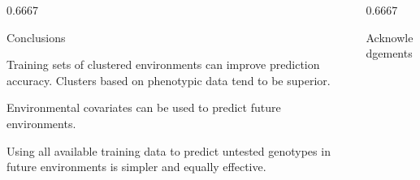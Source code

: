 \documentclass[final]{beamer}
\newlength{\onecolwid}
\newlength{\twocolwid}
\begin{document}
\begin{frame}[t]
\begin{columns}[t]
\begin{column}{\twocolwid}
\begin{columns}[t,totalwidth=\twocolwid]

\begin{column}{0.6667\onecolwid}


\begin{alertblock}{Conclusions}

\begin{footnotesize}

Training sets of clustered environments can improve prediction accuracy. Clusters based on phenotypic data tend to be superior.

\vspace{0.5cm}

Environmental covariates can be used to predict future environments.

\vspace{0.5cm}

Using all available training data to predict untested genotypes in future environments is simpler and equally effective.



\end{footnotesize}

\end{alertblock}


\end{column}




\begin{column}{0.6667\onecolwid} %



\begin{block}{\large{Acknowledgements}}


\end{block}
\end{column}
\end{columns}
\end{column}
\end{columns}
\end{frame}
\end{document}
